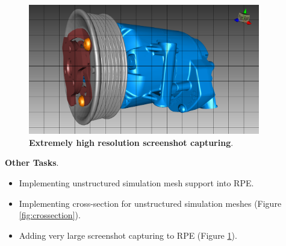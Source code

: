 \documentclass[]{report}
\begin{document}
\begin{figure}[!ht]
	\centering
	\includegraphics[width=0.90\textwidth]{./figs/highresscreenshot.png}
	\caption[Extremely high resolution screenshot capturing]{\textbf{Extremely high resolution screenshot capturing}.}
	\label{fig:highres}
\end{figure}



\textbf{Other Tasks}.
\begin{itemize}
	\item Implementing unstructured simulation mesh support into RPE.
	\item Implementing cross-section for unstructured simulation meshes (Figure \ref{fig:crossection}).
	\item Adding very large screenshot capturing to RPE (Figure \ref{fig:highres}).
\end{itemize}
 
\end{document}
